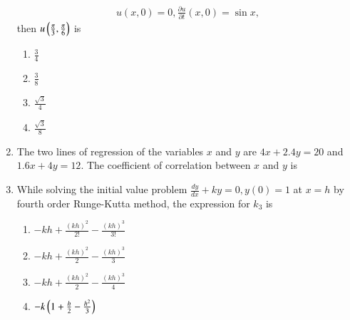 \documentclass[journal]{IEEEtran}
\begin{document}
\begin{enumerate}
\begin{align*}
u(x, 0)=0,
\frac{\partial u}{\partial t}(x, 0)=\sin x,
                 \end{align*}
then $u\left(\frac{\pi}{3}, \frac{\pi}{6}\right)$ is
		\begin{enumerate}
			\item $\frac{3}{4}$
			\item $\frac{3}{8}$
	         	\item $\frac{\sqrt{3}}{4}$
                 	\item $\frac{\sqrt{3}}{8}$
	\end{enumerate}	
    \item The two lines of regression of the variables $x$ and $y$ are $4 x+2.4 y=20$ and $1.6 x+4 y=12$.
The coefficient of correlation between $x$ and $y$ is
      \begin{enumerate}
	       \end{enumerate}
        \item  While solving the initial value problem
$\frac{d y}{d x}+k y=0, y(0)=1$ at $x=h$ by fourth order Runge-Kutta method, the expression for $k_{3}$ is
            \begin{enumerate}
			\item $-k h+\frac{(k h)^{2}}{2!}-\frac{(k h)^{3}}{3!}$
			\item $-k h+\frac{(k h)^{2}}{2}-\frac{(k h)^{3}}{3}$
			\item $-k h+\frac{(k h)^{2}}{2}-\frac{(k h)^{3}}{4}$
			\item $-k\left(1+\frac{h}{2}-\frac{h^{2}}{3}\right)$
        	\end{enumerate}	
\end{enumerate}		
\end{document}
